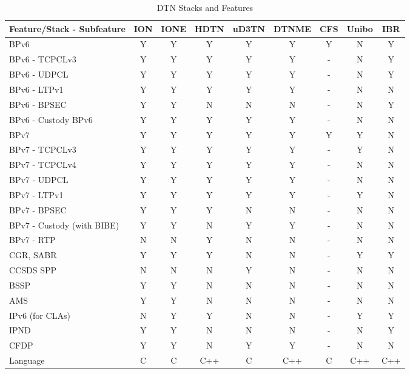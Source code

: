\begin{table}[htbp]
\centering
\small
\setlength{\tabcolsep}{6pt}
\renewcommand{\arraystretch}{1.1}
\caption{DTN Stacks and Features}
\label{tab:DTN_Stacks}
\begin{tabular}{lcccccccc}
\hline
Feature/Stack - Subfeature & ION & IONE & HDTN & uD3TN & DTNME & CFS & Unibo & IBR \\
\hline
BPv6                        & Y & Y & Y & Y & Y & Y & N & Y \\
BPv6 - TCPCLv3              & Y & Y & Y & Y & Y & - & N & Y \\
BPv6 - UDPCL                & Y & Y & Y & Y & Y & - & N & Y \\
BPv6 - LTPv1                & Y & Y & Y & Y & Y & - & N & N \\
BPv6 - BPSEC                & Y & Y & N & N & N & - & N & Y \\
BPv6 - Custody BPv6         & Y & Y & Y & Y & Y & - & N & N \\
BPv7                        & Y & Y & Y & Y & Y & Y & Y & N \\
BPv7 - TCPCLv3              & Y & Y & Y & Y & Y & - & Y & N \\
BPv7 - TCPCLv4              & Y & Y & Y & Y & Y & - & N & N \\
BPv7 - UDPCL                & Y & Y & Y & Y & Y & - & N & N \\
BPv7 - LTPv1                & Y & Y & Y & Y & Y & - & Y & N \\
BPv7 - BPSEC                & Y & Y & Y & N & N & - & N & N \\
BPv7 - Custody (with BIBE)  & Y & Y & N & Y & Y & - & N & N \\
BPv7 - RTP                  & N & N & Y & N & N & - & N & N \\
CGR, SABR                   & Y & Y & Y & N & N & - & Y & Y \\
CCSDS SPP                   & N & N & N & Y & N & - & N & N \\
BSSP                        & Y & Y & N & N & N & - & N & N \\
AMS                         & Y & Y & N & N & N & - & N & N \\
IPv6 (for CLAs)             & N & Y & Y & N & N & - & Y & Y \\
IPND                        & Y & Y & N & N & N & - & N & Y \\
CFDP                        & Y & Y & N & Y & Y & - & N & N \\
Language                    & C & C & C++ & C & C++ & C & C++ & C++ \\
\hline
\end{tabular}
\end{table}


